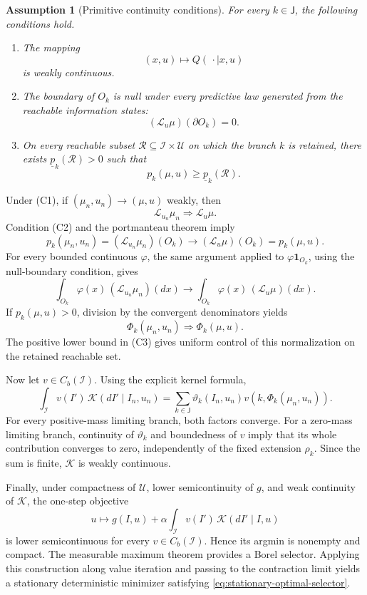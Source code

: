 \documentclass[10pt,twocolumn]{article}
\newtheorem{assumption}{Assumption}
\theoremstyle{remark}
\newcommand{\Ucal}{\mathcal{U}}
\newcommand{\Ical}{\mathcal{I}}
\newcommand{\one}{\mathbf{1}}
\begin{document}
\begin{assumption}[Primitive continuity conditions]
	\label{ass:primitive-continuity}
	For every \(k\in\mathsf J\), the following conditions hold.
	\begin{enumerate}[label=\textnormal{(C\arabic*)},leftmargin=*]
		\item The mapping
		\[
		(x,u)\longmapsto Q(\,\cdot\mid x,u)
		\]
		is weakly continuous.
		\item The boundary of \(O_k\) is null under every predictive law generated from the reachable information states:
		\[
		(\mathcal L_u\mu)(\partial O_k)=0.
		\]
		\item On every reachable subset \(\mathcal R\subseteq\Ical\times\Ucal\) on which the branch \(k\) is retained, there exists \(\underline p_k(\mathcal R)>0\) such that
		\[
		p_k(\mu,u)\geq\underline p_k(\mathcal R).
		\]
	\end{enumerate}
\end{assumption}

Under (C1), if \((\mu_n,u_n)\to(\mu,u)\) weakly, then
\[
\mathcal L_{u_n}\mu_n
\Rightarrow
\mathcal L_u\mu.
\]
Condition (C2) and the portmanteau theorem imply
\[
p_k(\mu_n,u_n)
=
(\mathcal L_{u_n}\mu_n)(O_k)
\longrightarrow
(\mathcal L_u\mu)(O_k)
=
p_k(\mu,u).
\]
For every bounded continuous \(\varphi\), the same argument applied to
\(\varphi\one_{O_k}\), using the null-boundary condition, gives
\[
\int_{O_k}\varphi(x)\,
(\mathcal L_{u_n}\mu_n)(dx)
\longrightarrow
\int_{O_k}\varphi(x)\,
(\mathcal L_u\mu)(dx).
\]
If \(p_k(\mu,u)>0\), division by the convergent denominators yields
\[
\Phi_k(\mu_n,u_n)
\Rightarrow
\Phi_k(\mu,u).
\]
The positive lower bound in (C3) gives uniform control of this normalization on the retained reachable set.

Now let \(v\in C_b(\Ical)\). Using the explicit kernel formula,
\[
\int_{\Ical}v(I')\,
\mathcal K(dI'\mid I_n,u_n)
=
\sum_{k\in\mathsf J}
\vartheta_k(I_n,u_n)
v\!\left(k,\Phi_k(\mu_n,u_n)\right).
\]
For every positive-mass limiting branch, both factors converge. For a zero-mass limiting branch, continuity of \(\vartheta_k\) and boundedness of \(v\) imply that its whole contribution converges to zero, independently of the fixed extension \(\rho_k\). Since the sum is finite, \(\mathcal K\) is weakly continuous.

Finally, under compactness of \(\Ucal\), lower semicontinuity of \(g\), and weak continuity of \(\mathcal K\), the one-step objective
\[
u\longmapsto
g(I,u)+\alpha\int_{\Ical}v(I')\,
\mathcal K(dI'\mid I,u)
\]
is lower semicontinuous for every \(v\in C_b(\Ical)\). Hence its argmin is nonempty and compact. The measurable maximum theorem provides a Borel selector. Applying this construction along value iteration and passing to the contraction limit yields a stationary deterministic minimizer satisfying \cref{eq:stationary-optimal-selector}.
\end{document}
